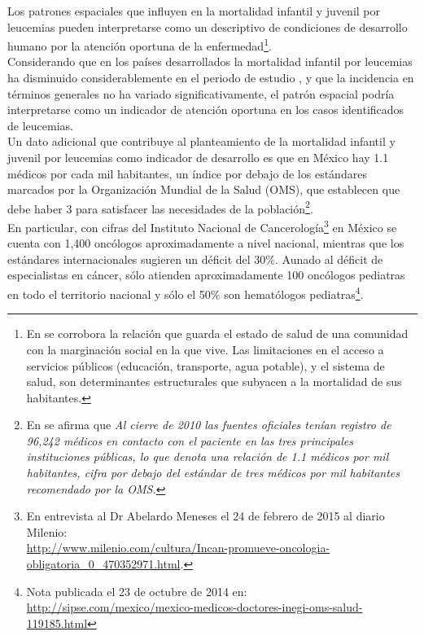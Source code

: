 \documentclass[11pt, oneside]{book}
\begin{document}
Los patrones espaciales que influyen en la mortalidad infantil y juvenil por leucemias pueden interpretarse como un descriptivo de condiciones de desarrollo humano por la atención oportuna de la enfermedad\footnote{En \cite{duarte} se corrobora la relación que guarda el estado de salud de una comunidad con la marginación social en la que vive. Las limitaciones en el acceso a servicios públicos (educación, transporte, agua potable), y el sistema de salud, son determinantes estructurales que subyacen a la mortalidad de sus habitantes.}.\\ 

Considerando que en los países desarrollados la mortalidad infantil por leucemias ha disminuido considerablemente en el periodo de estudio \cite{couto}, y que la incidencia en términos generales no ha variado significativamente, el patrón espacial podría interpretarse como un indicador de atención oportuna en los casos identificados de leucemias.\\

Un dato adicional que contribuye al planteamiento de la mortalidad infantil y juvenil por leucemias como indicador de desarrollo es que en México hay 1.1 médicos por 
cada mil habitantes, un índice por debajo de los estándares marcados por la Organización  Mundial de la Salud (OMS), que establecen que debe haber 3 para satisfacer las necesidades de la población\footnote{En \cite{observatorio} se afirma que \emph{Al  cierre  de  2010  las  fuentes  oficiales  tenían  registro  de  96,242 médicos en  contacto  con  el paciente  en  las  tres  principales  instituciones  públicas,  lo  que  denota  una  relación  de  1.1 médicos por mil habitantes, cifra por debajo del estándar de tres médicos por mil habitantes recomendado  por  la  OMS.}}.\\ 


En particular, con cifras del Instituto Nacional de Cancerología\footnote{En entrevista al Dr Abelardo Meneses el 24 de febrero de 2015 al diario Milenio:\\ \url{http://www.milenio.com/cultura/Incan-promueve-oncologia-obligatoria_0_470352971.html}.} en México se cuenta con 1,400 oncólogos aproximadamente a nivel nacional, mientras que los estándares internacionales sugieren un déficit del 30\%. Aunado al déficit de especialistas en cáncer, sólo atienden aproximadamente 100 oncólogos pediatras en todo el territorio nacional y sólo el 50\% son hematólogos pediatras\footnote{Nota publicada el 23 de octubre de 2014 en:\\  \url{http://sipse.com/mexico/mexico-medicos-doctores-inegi-oms-salud-119185.html}}.\\
\end{document}
